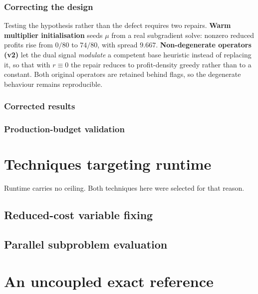 \documentclass[11pt,a4paper]{article}
\begin{document}
\subsubsection{Correcting the design}\label{sec:h2-fix}

Testing the hypothesis rather than the defect requires two repairs. \textbf{Warm
multiplier initialisation} seeds $\mu$ from a real subgradient solve: nonzero
reduced profits rise from $0/80$ to $74/80$, with spread $9.667$.
\textbf{Non-degenerate operators (v2)} let the dual signal \emph{modulate} a
competent base heuristic instead of replacing it, so that with $r\equiv 0$ the
repair reduces to profit-density greedy rather than to a constant. Both original
operators are retained behind flags, so the degenerate behaviour remains
reproducible.

\subsubsection{Corrected results}\label{sec:h2-results}



\subsubsection{Production-budget validation}\label{sec:prod}



\section{Techniques targeting runtime}\label{sec:runtime}

Runtime carries no ceiling. Both techniques here were selected for that reason.

\subsection{Reduced-cost variable fixing}\label{sec:fixing}



\subsection{Parallel subproblem evaluation}\label{sec:parallel}



\section{An uncoupled exact reference}\label{sec:exact}
\end{document}

